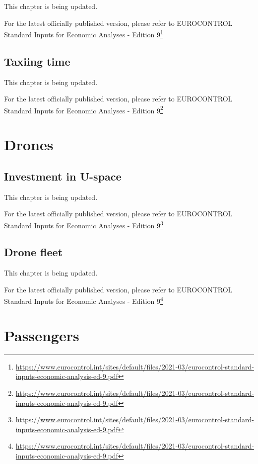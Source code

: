 \documentclass[
  11pt,
  a4paper,
]{book}
\DeclareRobustCommand{\href}[2]{#2\footnote{\url{#1}}}
\begin{document}
This chapter is being updated.

For the latest officially published version, please refer to
\href{https://www.eurocontrol.int/sites/default/files/2021-03/eurocontrol-standard-inputs-economic-analysis-ed-9.pdf}{EUROCONTROL
Standard Inputs for Economic Analyses - Edition 9}

\hypertarget{sec-taxiing-times}{%
\chapter{Taxiing time}\label{sec-taxiing-time}}

This chapter is being updated.

For the latest officially published version, please refer to
\href{https://www.eurocontrol.int/sites/default/files/2021-03/eurocontrol-standard-inputs-economic-analysis-ed-9.pdf}{EUROCONTROL
Standard Inputs for Economic Analyses - Edition 9}

\part{Drones}

\hypertarget{sec-investment-in-u-space}{%
\chapter{Investment in U-space}\label{sec-investment-in-u-space}}

This chapter is being updated.

For the latest officially published version, please refer to
\href{https://www.eurocontrol.int/sites/default/files/2021-03/eurocontrol-standard-inputs-economic-analysis-ed-9.pdf}{EUROCONTROL
Standard Inputs for Economic Analyses - Edition 9}

\hypertarget{sec-drone-fleet}{%
\chapter{Drone fleet}\label{sec-drone-fleet}}

This chapter is being updated.

For the latest officially published version, please refer to
\href{https://www.eurocontrol.int/sites/default/files/2021-03/eurocontrol-standard-inputs-economic-analysis-ed-9.pdf}{EUROCONTROL
Standard Inputs for Economic Analyses - Edition 9}

\part{Passengers}
\end{document}

